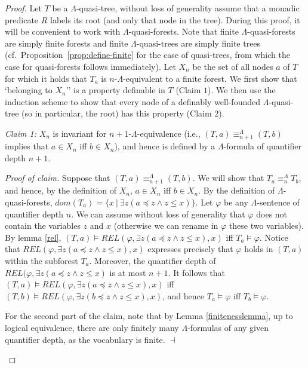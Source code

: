 \documentclass{LMCS}
\newenvironment{proofofclaim}{\begin{trivlist}\item\textit{Proof of claim.}}{\hfill$\dashv$\end{trivlist}}
\begin{document}
\begin{proof}
  Let $T$ be a $\Lambda$-quasi-tree, without loss of generality assume that a monadic predicate $R$ labels its root (and only that node in the tree). During this proof, it will be convenient to work with
  $\Lambda$-quasi-forests. Note that finite $\Lambda$-quasi-forests
  are simply finite forests and finite $\Lambda$-quasi-trees are
  simply finite trees (cf.~Proposition~\ref{prop:define-finite} for
  the case of quasi-trees, from which the case for quasi-forests
  follows immediately). Let $X_n$ be the set of all nodes $a$ of $T$ for
  which it holds that $T_a$ is $n$-$\Lambda$-equivalent to a finite
  forest. We first show that `belonging to $X_n$'' is a property definable in $T$ (Claim $1$).
  We then use the induction scheme to show that every node of a definably well-founded $\Lambda$-quasi-tree (so in particular, the root) has this property (Claim $2$).
  \medskip\par\noindent\emph{Claim 1:}
    $X_n$ is invariant for $n+1$-$\Lambda$-equivalence (i.e.,
    $(T,a)\equiv_{n+1}^\Lambda (T,b)$ implies that $a\in X_n$ iff $b\in X_n$), and
    hence is defined by a $\Lambda$-formula of
    quantifier depth $n+1$.


  \begin{proofofclaim}
    Suppose that $(T,a)\equiv_{n+1}^\Lambda(T,b)$.
    We will show that $T_a\equiv_{n}^\Lambda T_b$, and hence, by the
    definition of $X_n$, $a\in X_n$ iff $b\in X_n$.
     By the definition of $\Lambda$-quasi-forests, $dom(T_a)=\{x ~|~\exists z (a \preceq z\wedge z \leq x)\}$. Let $\varphi$ be any $\Lambda$-sentence of quantifier depth $n$. We can assume without loss of generality that $\varphi$ does not contain the variables $z$ and $x$ (otherwise we can rename in $\varphi$ these two variables). By lemma \ref{rel}, $(T,a)\models REL(\varphi,\exists z (a \preceq z\wedge z \leq x),x)$ iff $T_a \models \varphi$.
    Notice that $REL(\varphi,\exists z (a \preceq z\wedge z \leq x),x)$ expresses precisely that $\varphi$
    holds in $(T,a)$ within the subforest $T_a$. Moreover, the quantifier depth of
    $REL(\varphi,\exists z (a \preceq z\wedge z \leq x)$ is at most $n+1$. It follows that $(T,a)\models REL(\varphi,\exists z (a \preceq z\wedge z \leq x),x)$
    iff $(T,b)\models REL(\varphi,\exists z (b \preceq z\wedge z \leq x),x)$, and hence $T_a\models\varphi$ iff
    $T_b\models\varphi$.

    For the second part of the claim, note that by Lemma \ref{finitenesslemma}, up to logical equivalence, there are only
    finitely many $\Lambda$-formulas of any given quantifier depth,
    as the vocabulary is finite.
  \end{proofofclaim}




\end{proof}
\end{document}
